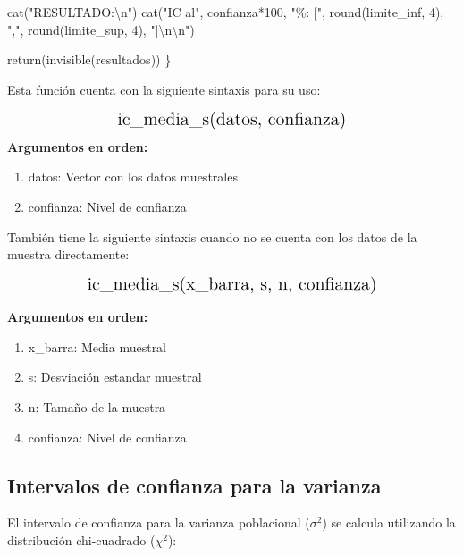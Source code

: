 \documentclass[
  spanish,
  letterpaper,
]{book}
\newenvironment{Shaded}{\begin{snugshade}}{\end{snugshade}}
\newcommand{\DecValTok}[1]{\textcolor[rgb]{0.68,0.00,0.00}{#1}}
\newcommand{\FunctionTok}[1]{\textcolor[rgb]{0.28,0.35,0.67}{#1}}
\newcommand{\NormalTok}[1]{\textcolor[rgb]{0.00,0.23,0.31}{#1}}
\newcommand{\SpecialCharTok}[1]{\textcolor[rgb]{0.37,0.37,0.37}{#1}}
\newcommand{\StringTok}[1]{\textcolor[rgb]{0.13,0.47,0.30}{#1}}
\begin{document}
\begin{Shaded}
\begin{Highlighting}[]
  \FunctionTok{cat}\NormalTok{(}\StringTok{"RESULTADO:}\SpecialCharTok{\textbackslash{}n}\StringTok{"}\NormalTok{)}
  \FunctionTok{cat}\NormalTok{(}\StringTok{"IC al"}\NormalTok{, confianza}\SpecialCharTok{*}\DecValTok{100}\NormalTok{, }\StringTok{"\%: ["}\NormalTok{, }\FunctionTok{round}\NormalTok{(limite\_inf, }\DecValTok{4}\NormalTok{), }
      \StringTok{","}\NormalTok{, }\FunctionTok{round}\NormalTok{(limite\_sup, }\DecValTok{4}\NormalTok{), }\StringTok{"]}\SpecialCharTok{\textbackslash{}n\textbackslash{}n}\StringTok{"}\NormalTok{)}
  
  \FunctionTok{return}\NormalTok{(}\FunctionTok{invisible}\NormalTok{(resultados))}
\NormalTok{\}}
\end{Highlighting}
\end{Shaded}

Esta función cuenta con la siguiente sintaxis para su uso:

\[
\Large \text{ic\_media\_s(datos, confianza)}
\] \textbf{Argumentos en orden:}

\begin{enumerate}
\def\labelenumi{\arabic{enumi}.}
\item
  datos: Vector con los datos muestrales
\item
  confianza: Nivel de confianza
\end{enumerate}

También tiene la siguiente sintaxis cuando no se cuenta con los datos de
la muestra directamente:

\[
\Large \text{ic\_media\_s(x\_barra, s, n, confianza)}
\]

\textbf{Argumentos en orden:}

\begin{enumerate}
\def\labelenumi{\arabic{enumi}.}
\item
  x\_barra: Media muestral
\item
  s: Desviación estandar muestral
\item
  n: Tamaño de la muestra
\item
  confianza: Nivel de confianza
\end{enumerate}

\subsection{Intervalos de confianza para la
varianza}\label{intervalos-de-confianza-para-la-varianza}

El intervalo de confianza para la varianza poblacional (\(\sigma^2\)) se
calcula utilizando la distribución chi-cuadrado (\(\chi^2\)):
\end{document}
